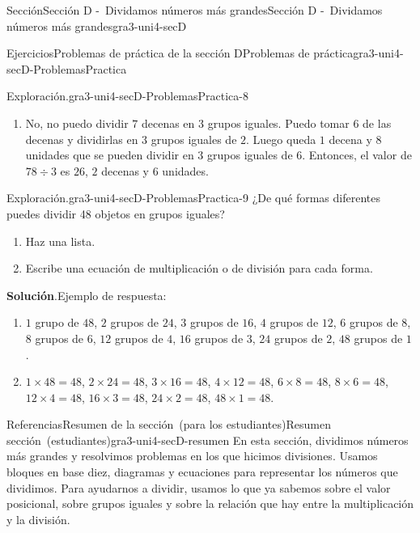 \documentclass[oneside,10pt,]{article}
\newcommand{\blocktitlefont}{\relax}
\begin{document}
\begin{sectionptx}{Sección}{Sección D -~Dividamos números más grandes}{}{Sección D -~Dividamos números más grandes}{}{}{gra3-uni4-secD}
\begin{exercises-subsection}{Ejercicios}{Problemas de práctica de la sección D}{}{Problemas de práctica}{}{}{gra3-uni4-secD-ProblemasPractica}
\begin{divisionexercise}{6}{Exploración.}{}{gra3-uni4-secD-ProblemasPractica-8}
\begin{enumerate}[label={(\alph*)}]
\item{}No, no puedo dividir \(7\) decenas en \(3\) grupos iguales. Puedo tomar \(6\) de las decenas y dividirlas en \(3\) grupos iguales de \(2\). Luego queda \(1\) decena y \(8\) unidades que se pueden dividir en \(3\) grupos iguales de \(6\). Entonces, el valor de \(78\div 3\) es \(26\), \(2\) decenas y \(6\) unidades.%
\end{enumerate}
\end{divisionexercise}%
\begin{divisionexercise}{7}{Exploración.}{}{gra3-uni4-secD-ProblemasPractica-9}%
¿De qué formas diferentes puedes dividir 48 objetos en grupos iguales?%
%
\begin{enumerate}[label={(\alph*)}]
\item{}Haz una lista.%
\item{}Escribe una ecuación de multiplicación o de división para cada forma.%
\end{enumerate}
\par\smallskip%
\noindent\textbf{\blocktitlefont Solución}.\hypertarget{gra3-uni4-secD-ProblemasPractica-9-3}{}\quad{}Ejemplo de respuesta:%
%
\begin{enumerate}[label={(\alph*)}]
\item{}\(1\) grupo de \(48\), \(2\) grupos de \(24\), \(3\) grupos de \(16\), \(4\) grupos de \(12\), \(6\) grupos de \(8\), \(8\) grupos de \(6\), \(12\) grupos de \(4\), \(16\) grupos de \(3\), \(24\) grupos de \(2\), \(48\) grupos de \(1\).%
\item{}\(1 \times 48 = 48\), \(2 \times 24 = 48\), \(3 \times 16 = 48\), \(4 \times 12 = 48\), \(6 \times 8 = 48\), \(8 \times 6 = 48\), \(12 \times 4 = 48\), \(16 \times 3 = 48\), \(24 \times 2 = 48\), \(48 \times 1 = 48\).%
\end{enumerate}
\end{divisionexercise}%
\end{exercises-subsection}
%
%
\typeout{************************************************}
\typeout{************************************************}
%
\begin{references-subsection}{Referencias}{Resumen de la sección~(para los estudiantes)}{}{Resumen sección~(estudiantes)}{}{}{gra3-uni4-secD-resumen}
En esta sección, dividimos números más grandes y resolvimos problemas en los que hicimos divisiones. Usamos bloques en base diez, diagramas y ecuaciones para representar los números que dividimos. Para ayudarnos a dividir, usamos lo que ya sabemos sobre el valor posicional, sobre grupos iguales y sobre la relación que hay entre la multiplicación y la división.%

\end{references-subsection}
\end{sectionptx}
\end{document}
